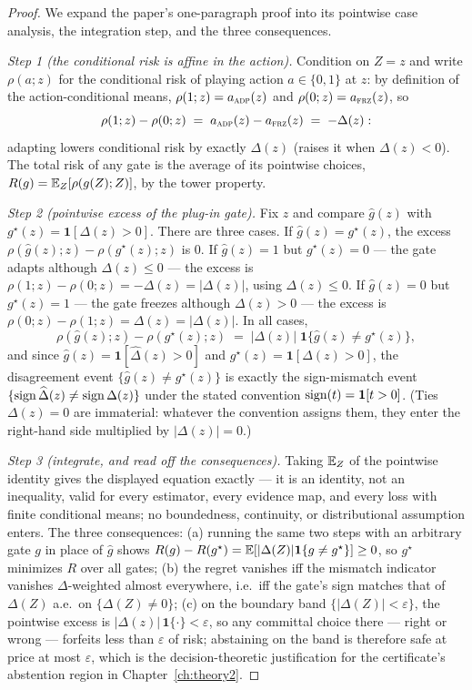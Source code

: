 \begin{proof}
We expand the paper's one-paragraph proof into its pointwise case
analysis, the integration step, and the three consequences.

\emph{Step 1 (the conditional risk is affine in the action).}
Condition on $Z=z$ and write $\rho(a;z)$ for the conditional risk of
playing action $a\in\{0,1\}$ at $z$: by definition of the
action-conditional means, $\rho(1;z)=a_{\textsc{adp}}(z)$ and
$\rho(0;z)=a_{\textsc{frz}}(z)$, so
\[
\rho(1;z)-\rho(0;z)\;=\;a_{\textsc{adp}}(z)-a_{\textsc{frz}}(z)\;=\;-\Delta(z):
\]
adapting lowers conditional risk by exactly $\Delta(z)$ (raises it when
$\Delta(z)<0$). The total risk of any gate is the average of its pointwise
choices, $R(g)=\mathbb{E}_Z[\rho(g(Z);Z)]$, by the tower property.

\emph{Step 2 (pointwise excess of the plug-in gate).}
Fix $z$ and compare $\widehat g(z)$ with $g^\star(z)=\mathbf1[\Delta(z)>0]$.
There are three cases.
If $\widehat g(z)=g^\star(z)$, the excess
$\rho(\widehat g(z);z)-\rho(g^\star(z);z)$ is $0$.
If $\widehat g(z)=1$ but $g^\star(z)=0$ --- the gate adapts although
$\Delta(z)\le0$ --- the excess is $\rho(1;z)-\rho(0;z)=-\Delta(z)=
|\Delta(z)|$, using $\Delta(z)\le0$.
If $\widehat g(z)=0$ but $g^\star(z)=1$ --- the gate freezes although
$\Delta(z)>0$ --- the excess is $\rho(0;z)-\rho(1;z)=\Delta(z)=
|\Delta(z)|$. In all cases,
\[
\rho(\widehat g(z);z)-\rho(g^\star(z);z)
\;=\;|\Delta(z)|\;\mathbf1\{\widehat g(z)\neq g^\star(z)\},
\]
and since $\widehat g(z)=\mathbf1[\widehat\Delta(z)>0]$ and
$g^\star(z)=\mathbf1[\Delta(z)>0]$, the disagreement event
$\{\widehat g(z)\neq g^\star(z)\}$ is exactly the sign-mismatch event
$\{\operatorname{sign}\widehat\Delta(z)\neq\operatorname{sign}\Delta(z)\}$ under the stated convention
$\operatorname{sign}(t)=\mathbf1[t>0]$. (Ties $\Delta(z)=0$ are immaterial: whatever the
convention assigns them, they enter the right-hand side multiplied by
$|\Delta(z)|=0$.)

\emph{Step 3 (integrate, and read off the consequences).}
Taking $\mathbb{E}_Z$ of the pointwise identity gives the displayed equation
exactly --- it is an identity, not an inequality, valid for every
estimator, every evidence map, and every loss with finite conditional
means; no boundedness, continuity, or distributional assumption enters.
The three consequences: (a) running the same two steps with an arbitrary
gate $g$ in place of $\widehat g$ shows
$R(g)-R(g^\star)=\mathbb{E}[|\Delta(Z)|\mathbf1\{g\neq g^\star\}]\ge0$, so
$g^\star$ minimizes $R$ over all gates; (b) the regret vanishes iff the
mismatch indicator vanishes $\Delta$-weighted almost everywhere, i.e.\ iff
the gate's sign matches that of $\Delta(Z)$ a.e.\ on
$\{\Delta(Z)\neq0\}$; (c) on the boundary band
$\{|\Delta(Z)|<\varepsilon\}$, the pointwise excess is
$|\Delta(z)|\,\mathbf1\{\cdot\}<\varepsilon$, so any committal choice
there --- right or wrong --- forfeits less than $\varepsilon$ of risk;
abstaining on the band is therefore safe at price at most $\varepsilon$,
which is the decision-theoretic justification for the certificate's
abstention region in Chapter~\ref{ch:theory2}.
\end{proof}

